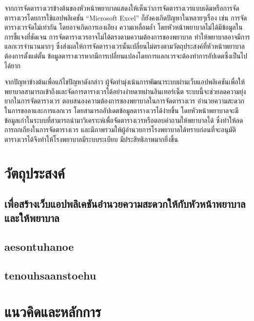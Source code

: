 จากการจัดตารางเวรข้างต้นของหัวหน้าพยาบาลแสดงให้เห็นว่าการจัดตารางเวรแบบเดิมหรือการจัดตารางเวรโดยการใช้แอปพลิเคชัน “Microsoft Excel” ก็ยังคงเกิดปัญหาในหลายๆเรื่อง เช่น การจัดตารางเวรจัดไม่เท่ากัน โดยอาจเกิดการเองเอียง ความเหลื่อมล้ำ โดยหัวหน้าพยาบาลไม่ได้มีข้อมูลในการชี้แจงที่ชัดเจน การจัดตารางเวรอาจไม่ได้ตรงตามความต้องการของพยาบาล ทำให้พยาบาลอาจมีการแลกเวรจำนวนมากๆ ซึ่งส่งผลให้การจัดตารางเวรนั้นเปลี่ยนไม่ตรงตามวัตถุประสงค์ที่หัวหน้าพยาบาลต้องการตั้งแต่ตั้น ข้อมูลตารางเวรหากมีการเปลี่ยนแปลงโดยการแลกเวรจะต้องทำการอัปเดตซึ่งเป็นไปได้ยาก 

จากปัญหาข้างต้นเพื่อแก้ไขปัญหาดังกล่าว ผู้จัดทำมุ่งเน้นการพัฒนาระบบผ่านเว็บแอปพลิเคชันเพื่อให้พยาบาลสามารถเข้าถึงและจัดการตารางเวรได้อย่างง่ายดายผ่านอินเทอร์เน็ต ระบบนี้จะช่วยลดความยุ่งยากในการจัดตารางเวร ตอบสนองความต้องการของพยาบาลในการจัดตารางเวร อำนวยความสะดวกในการขอลาและการแลกเวร โดยสามารถอัปเดตข้อมูลตารางเวรได้ง่ายขึ้น โดยหัวหน้าพยาบาลจะมีข้อมูลเก่าในระบบที่สามารถนำมาวิเคราะห์เพื่อจัดตารางเวรหรือตอบคำถามให้พยาบาลได้ ซึ่งทำให้ลดการถกเถียงในการจัดตารางเวร และมีภาพรวมให้ผู้อำนวยการโรงพยาบาลได้ทราบก่อนที่จะอนุมัติตารางเวรได้จึงทำให้โรงพยาบาลมีระบบระเบียบ มีประสิทธิภาพมากยิ่งขึ้น

\section{{วัตถุประสงค์}}

\hspace{0cm}\subsection{เพื่อสร้างเว็บแอปพลิเคชันอำนวยความสะดวกให้กับหัวหน้าพยาบาลและให้พยาบาล}

\hspace{0cm}\subsection{aesontuhanoe}

\hspace{0cm}\subsection{tenouhsaanstoehu}

\section{แนวคิดและหลักการ}

